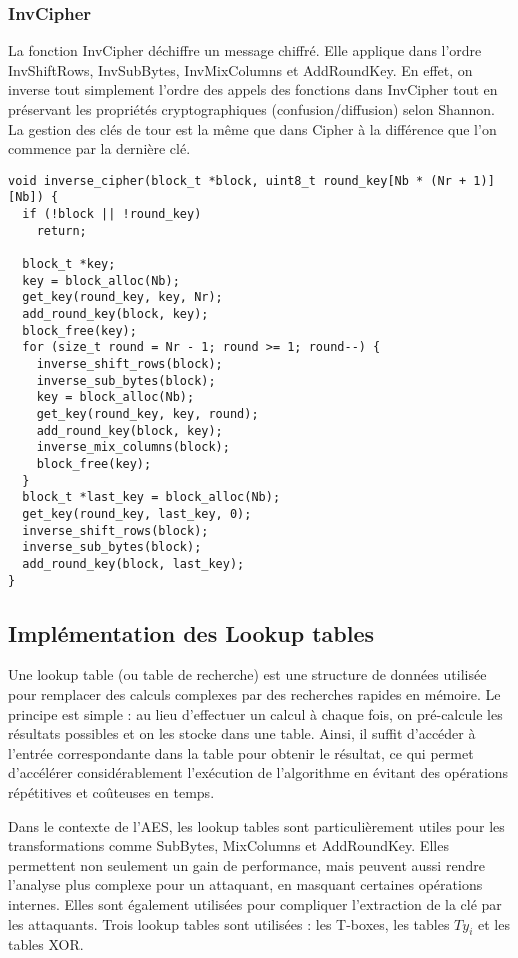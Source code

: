 \documentclass[a4paper, 10pt]{article}
\begin{document}
  \subsubsection{InvCipher}
  \label{sec:invcipher}
  La fonction InvCipher déchiffre un message chiffré. Elle applique dans 
  l'ordre InvShiftRows, InvSubBytes, InvMixColumns et AddRoundKey. En effet, on 
  inverse tout simplement l'ordre des appels des fonctions dans InvCipher tout en préservant les 
  propriétés cryptographiques (confusion/diffusion) selon Shannon. La gestion des 
  clés de tour est la même que dans Cipher à la différence que l'on commence par la dernière clé.
\small{
    \begin{verbatim}
void inverse_cipher(block_t *block, uint8_t round_key[Nb * (Nr + 1)][Nb]) {
  if (!block || !round_key)
    return;

  block_t *key;
  key = block_alloc(Nb);
  get_key(round_key, key, Nr);
  add_round_key(block, key);
  block_free(key);
  for (size_t round = Nr - 1; round >= 1; round--) {
    inverse_shift_rows(block);
    inverse_sub_bytes(block);
    key = block_alloc(Nb);
    get_key(round_key, key, round);
    add_round_key(block, key);
    inverse_mix_columns(block);
    block_free(key);
  }
  block_t *last_key = block_alloc(Nb);
  get_key(round_key, last_key, 0);
  inverse_shift_rows(block);
  inverse_sub_bytes(block);
  add_round_key(block, last_key);
}
    \end{verbatim}
  }
  \subsection{Implémentation des Lookup tables}
  \normalsize
  Une lookup table (ou table de recherche) est une structure de données utilisée pour remplacer des calculs
  complexes par des recherches rapides en mémoire. Le principe est simple : au lieu d’effectuer un calcul à
  chaque fois, on pré-calcule les résultats possibles et on les stocke dans une table. Ainsi, il suffit
  d’accéder à l’entrée correspondante dans la table pour obtenir le résultat, ce qui permet d’accélérer
  considérablement l'exécution de l’algorithme en évitant des opérations répétitives et coûteuses en temps.
  
  Dans le contexte de l’AES, les lookup tables sont particulièrement utiles pour les transformations comme
  SubBytes, MixColumns et AddRoundKey. Elles permettent non seulement un gain de performance,
  mais peuvent aussi rendre l’analyse plus complexe pour un attaquant, en masquant certaines opérations internes.
  Elles sont également utilisées pour compliquer l’extraction de la clé par les attaquants. 
  Trois lookup tables sont utilisées : les T-boxes, les tables $Ty_{i}$ et les tables XOR.
  
\end{document}
